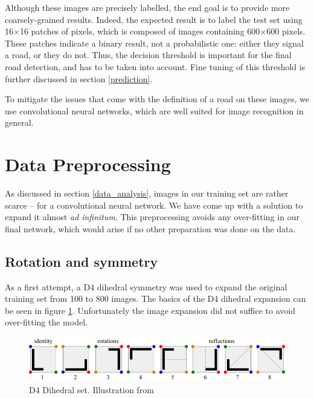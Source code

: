 \documentclass[10pt,conference,a4paper]{IEEEtran}
\begin{document}
Although these images are precisely labelled, the end goal is to provide more coarsely-grained results.
Indeed, the expected result is to label the test set using 16$\times$16 patches of pixels, which is composed of images containing 600$\times$600 pixels.
These patches indicate a binary result, not a probabilistic one: either they signal a road, or they do not.
Thus, the decision threshold is important for the final road detection, and has to be taken into account.
Fine tuning of this threshold is further discussed in section \ref{prediction}.

To mitigate the issues that come with the definition of a road on these images, we use convolutional neural networks, which are well suited for image recognition in general.

\section{Data Preprocessing}

As discussed in section \ref{data_analysis}, images in our training set are rather scarce -- for a convolutional neural network.
We have come up with a solution to expand it almost \textit{ad infinitum}.
This preprocessing avoids any over-fitting in our final network, which would arise if no other preparation was done on the data.

\subsection{Rotation and symmetry}
\label{rot_sym}

As a first attempt, a D4 dihedral symmetry was used to expand the original training set from 100 to 800 images.
The basics of the D4 dihedral expansion can be seen in figure \ref{fig:d4Dyhedral}.
Unfortunately the image expansion did not suffice to avoid over-fitting the model.

\begin{figure}[htpb]
    \centering
    \includegraphics[scale=0.37]{project2/report/images/symmetries.jpg}
    \caption{D4 Dihedral set. Illustration from \cite{d4Dihedral}}
    \label{fig:d4Dyhedral}
\end{figure}
\end{document}
